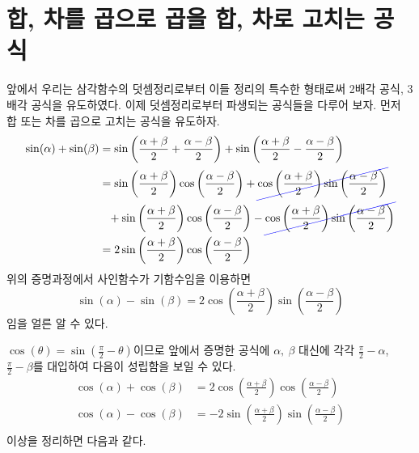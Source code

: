 \documentclass[11pt, a4paper]{book}
\begin{document}
\section{합, 차를 곱으로 곱을 합, 차로 고치는 공식}
 앞에서 우리는 삼각함수의 덧셈정리로부터 이들 정리의 특수한 형태로써 2배각 공식, 3배각 공식을 유도하였다. 이제 덧셈정리로부터 파생되는 공식들을 다루어 보자.  먼저 합 또는 차를 곱으로 고치는 공식을 유도하자.
 \begin{align*}
 	\sin(\alpha) + \sin(\beta) & = \sin\left(\frac{\alpha+\beta}{2} + \frac{\alpha-\beta}{2} \right) +\sin\left(\frac{\alpha+\beta}{2} - \frac{\alpha-\beta}{2} \right) \\
 	&= \sin\left(\frac{\alpha+\beta}{2}\right)\cos\left(\frac{\alpha-\beta}{2}\right) +\Ccancel[blue]{ \cos\left(\frac{\alpha+\beta}{2}\right) \sin\left(\frac{\alpha-\beta}{2}\right)}\\
 	&\phantom{=} + \sin\left(\frac{\alpha+\beta}{2}\right)\cos\left(\frac{\alpha-\beta}{2}\right) - \Ccancel[blue]{\cos\left(\frac{\alpha+\beta}{2}\right) \sin\left(\frac{\alpha-\beta}{2}\right)}\\
 	&= 2 \sin\left(\frac{\alpha+\beta}{2}\right) \cos\left(\frac{\alpha-\beta}{2}\right)
 \end{align*}
위의 증명과정에서 사인함수가 기함수임을 이용하면
 \[
	\sin(\alpha) - \sin(\beta)  =  2 \cos\left(\frac{\alpha+\beta}{2}\right) \sin\left(\frac{\alpha-\beta}{2}\right)
\] 
임을 얼른 알 수 있다.

$\cos(\theta) =\sin\left(\frac{\pi}{2}-\theta\right)$이므로 앞에서 증명한 공식에 $\alpha, \:\beta$ 대신에 각각 $\frac{\pi}{2}-\alpha$, $\frac{\pi}{2}-\beta$를 대입하여 다음이 성립함을 보일 수 있다.
\begin{align*}
	\cos(\alpha) +\cos(\beta) &= 2 \cos\left(\frac{\alpha+\beta}{2}\right) \cos\left(\frac{\alpha-\beta}{2}\right)\\
	\cos(\alpha) -\cos(\beta) &= -2 \sin\left(\frac{\alpha+\beta}{2}\right) \sin\left(\frac{\alpha-\beta}{2}\right)\\
\end{align*}
이상을 정리하면 다음과 같다.
\end{document}
